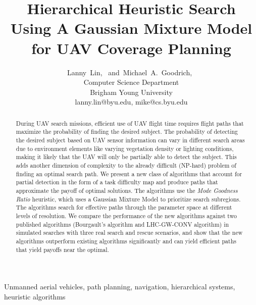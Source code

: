 \documentclass[journal]{IEEEtran}
\begin{document}
\title{Hierarchical Heuristic Search Using A Gaussian Mixture Model for UAV Coverage Planning}

\author{
Lanny~Lin,~
and~Michael~A.~Goodrich,~%
\\Computer Science Department \\ Brigham Young University \\ lanny.lin@byu.edu, mike@cs.byu.edu
}

\maketitle

\begin{abstract}
During UAV search missions, efficient use of UAV flight time requires flight paths that maximize the probability of finding the desired subject. The probability of detecting the desired subject based on UAV sensor information can vary in different search areas due to environment elements like varying vegetation density or lighting conditions, making it likely that the UAV will only be partially able to detect the subject. This adds another dimension of complexity to the already difficult (NP-hard) problem of finding an optimal search path. We present a new class of algorithms that account for partial detection in the form of a task difficulty map and produce paths that approximate the payoff of optimal solutions. The algorithms use the \textit{Mode Goodness Ratio} heuristic, which uses a Gaussian Mixture Model to prioritize search subregions. The algorithms search for effective paths through the parameter space at different levels of resolution. We compare the performance of the new algorithms against two published algorithms (Bourgault's algorithm and LHC-GW-CONV algorithm) in simulated searches with three real search and rescue scenarios, and show that the new algorithms outperform existing algorithms significantly and can yield efficient paths that yield payoffs near the optimal.  
\end{abstract}


\begin{IEEEkeywords}
Unmanned aerial vehicles, path planning, navigation, hierarchical systems, heuristic algorithms
\end{IEEEkeywords}

\IEEEpeerreviewmaketitle
\end{document}
